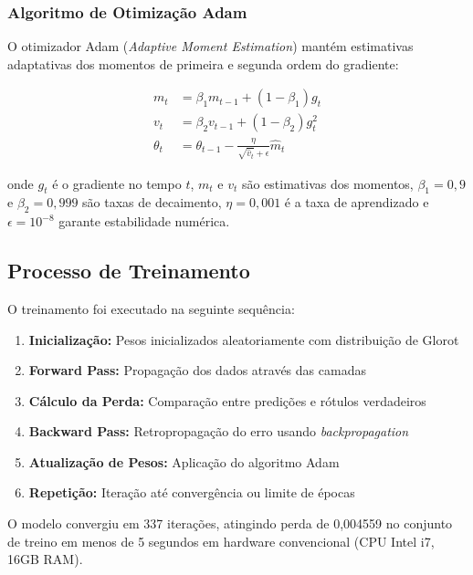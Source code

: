 \subsubsection{Algoritmo de Otimização Adam}

O otimizador Adam (\textit{Adaptive Moment Estimation}) \cite{kingma2014adam} mantém estimativas adaptativas dos momentos de primeira e segunda ordem do gradiente:

\begin{align}
m_t &= \beta_1 m_{t-1} + (1 - \beta_1) g_t \label{eq:adam_m} \\
v_t &= \beta_2 v_{t-1} + (1 - \beta_2) g_t^2 \label{eq:adam_v} \\
\theta_t &= \theta_{t-1} - \frac{\eta}{\sqrt{\hat{v}_t} + \epsilon} \hat{m}_t \label{eq:adam_update}
\end{align}

onde $g_t$ é o gradiente no tempo $t$, $m_t$ e $v_t$ são estimativas dos momentos, $\beta_1=0,9$ e $\beta_2=0,999$ são taxas de decaimento, $\eta=0,001$ é a taxa de aprendizado e $\epsilon=10^{-8}$ garante estabilidade numérica.

\subsection{Processo de Treinamento}

O treinamento foi executado na seguinte sequência:

\begin{enumerate}
    \item \textbf{Inicialização:} Pesos inicializados aleatoriamente com distribuição de Glorot \cite{glorot2010understanding}
    \item \textbf{Forward Pass:} Propagação dos dados através das camadas
    \item \textbf{Cálculo da Perda:} Comparação entre predições e rótulos verdadeiros
    \item \textbf{Backward Pass:} Retropropagação do erro usando \textit{backpropagation}
    \item \textbf{Atualização de Pesos:} Aplicação do algoritmo Adam
    \item \textbf{Repetição:} Iteração até convergência ou limite de épocas
\end{enumerate}

O modelo convergiu em 337 iterações, atingindo perda de 0,004559 no conjunto de treino em menos de 5 segundos em hardware convencional (CPU Intel i7, 16GB RAM).

